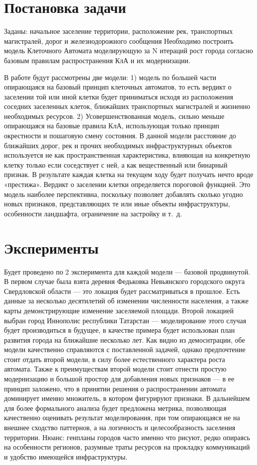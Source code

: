 \documentclass{article}
\begin{document}
\section{Постановка задачи}
Заданы: начальное заселение территории, расположение рек, транспортных магистралей, дорог и железнодорожного сообщения
Необходимо построить модель Клеточного Автомата моделирующую за N итераций рост города согласно базовым правилам распространения КлА и их модернизации.

В работе будут рассмотрены две модели:
1) модель по большей части опирающаяся на базовый принцип клеточных автоматов, то есть вердикт о заселении той или иной клетки будет приниматься исходя из расположения соседних заселенных клеток, ближайших транспортных магистралей и жизненно необходимых ресурсов.
2) Усовершенствованная модель, сильно меньше опирающаяся на базовые правила КлА, использующая только принцип окрестности и пошаговую смену состояния. В данной модели расстояние до ближайших дорог, рек и прочих необходимых инфраструктурных объектов используется не как пространственная характеристика, влияющая на конкретную клетку только если соседствует с ней, а как вещественный или бинарный признак. В результате каждая клетка на текущем ходу будет получать нечто вроде «престижа». Вердикт о заселении клетки определяется пороговой функцией. Это модель наиболее перспективна, поскольку позволяет добавлять сколько угодно новых признаков, представляющих те или иные объекты инфраструктуры, особенности ландшафта, ограничение на застройку и т. д.
\newpage

\section{Эксперименты}
Будет проведено по 2 эксперимента для каждой модели — базовой  продвинутой.
В первом случае была взята деревня Федьковка Невьянского городского округа Свердловской области — это локация будет рассматриваться в прошлое. Есть данные за несколько десятилетий об изменении численности населения, а также карты демонстрирующие изменение заселяемой площади.
Второй локацией выбран город Иннополис республики Татарстан — моделирование этого случая будет производиться в будущее, в качестве примера будет использован план развития города на ближайшие несколько лет.
Как видно из демоснтрации, обе модели качественно справляются с поставленной задачей, однако предпочтение стоит отдать второй модели, в силу более естественного характера роста автомата. Также к преимуществам второй модели стоит отнести простую модернизацию и большой простор для добавления новых признаков — в ее принцип заложено, что в принятии решения о распространении автомата доминирует именно множитель, в котором фигурируют признаки.
В дальнейшем для более формального анализа будет предложена метрика, позволяющая качественно оценивать результат моделирования, при том опирающаяся не на внешнее сходство паттернов, а на логичность и целесообразность заселения территории. 
Нюанс: генпланы городов часто именно что рисуют, редко опираясь на особенности регионов, разумные траты ресурсов на прокладку коммуникаций и удобство имеющейся инфраструктуры.
\end{document}

